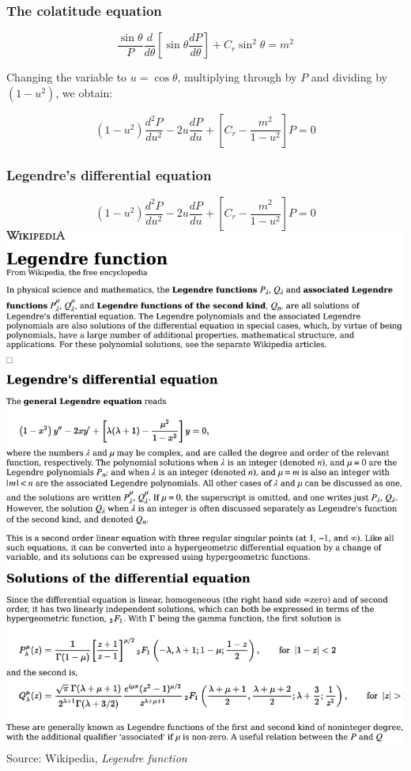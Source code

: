 \documentclass{beamer}
\begin{document}
\begin{frame}
\frametitle{The colatitude equation}

\[ \frac{\sin\theta}{P} \frac{d}{d\theta}\left[\sin\theta\frac{dP}{d\theta}\right] + C_r \sin^2\theta = m^2 \]

Changing the variable to $u=\cos \theta$, multiplying through by $P$ and dividing by $(1-u^2)$, we obtain:

\[ (1-u^2) \frac{d^2 P}{du^2} - 2u\frac{dP}{du} + \left[C_r - \frac{m^2}{1-u^2}\right]P = 0 \]

\end{frame}

\begin{frame}
\frametitle{Legendre's differential equation}
\[ (1-u^2) \frac{d^2 P}{du^2} - 2u\frac{dP}{du} + \left[C_r - \frac{m^2}{1-u^2}\right]P = 0 \]
\includegraphics[page=1, clip, trim=0in 3.7in 0in 3.5in, width=\textwidth]{Legendre function - Wikipedia.pdf}
\vfill
Source: Wikipedia, {\it Legendre function}
\end{frame}
\end{document}
